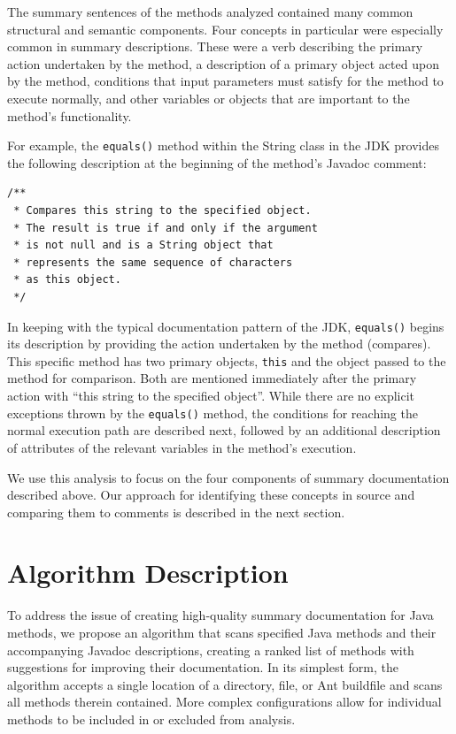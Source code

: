 \documentclass[preprint]{sigplanconf}
\begin{document}
The summary sentences of the methods analyzed contained many common structural and semantic components. Four concepts in particular were especially common in summary descriptions. These were a verb describing the primary action undertaken by the method, a description of a primary object acted upon by the method, conditions that input parameters must satisfy for the method to execute normally, and other variables or objects that are important to the method's functionality.

For example, the \verb|equals()| method within the String class in the JDK provides the following description at the beginning of the method's Javadoc comment:

\begin{lstlisting}
/**
 * Compares this string to the specified object.
 * The result is true if and only if the argument
 * is not null and is a String object that
 * represents the same sequence of characters
 * as this object.
 */
\end{lstlisting}

In keeping with the typical documentation pattern of the JDK, \verb|equals()| begins its description by providing the action undertaken by the method (compares). This specific method has two primary objects, \verb|this| and the object passed to the method for comparison. Both are mentioned immediately after the primary action with ``this string to the specified object''. While there are no explicit exceptions thrown by the \verb|equals()| method, the conditions for reaching the normal execution path are described next, followed by an additional description of attributes of the relevant variables in the method's execution.

We use this analysis to focus on the four components of summary documentation described above. Our approach for identifying these concepts in source and comparing them to comments is described in the next section.

\section{Algorithm Description}
To address the issue of creating high-quality summary documentation for Java methods, we propose an algorithm that scans specified Java methods and their accompanying Javadoc descriptions, creating a ranked list of methods with suggestions for improving their documentation. In its simplest form, the algorithm accepts a single location of a directory, file, or Ant buildfile and scans all methods therein contained. More complex configurations allow for individual methods to be included in or excluded from analysis.
\end{document}

